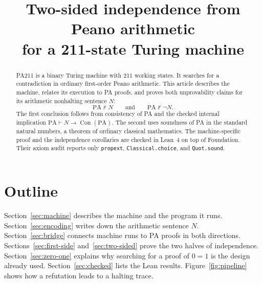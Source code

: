 \documentclass[11pt,letterpaper]{article}
\title{Two-sided independence from Peano arithmetic\\for a 211-state Turing machine}
\author{}
\date{}
\newcommand{\PA}{\mathrm{PA}}
\newcommand{\Con}{\operatorname{Con}}
\begin{document}
\maketitle
\begin{abstract}
PA211 is a binary Turing machine with 211 working states. It searches for
a contradiction in ordinary first-order Peano arithmetic. This article
describes the machine, relates its execution to PA proofs, and proves
both unprovability claims for its arithmetic nonhalting sentence $N$:
\[
\PA\nvdash N \qquad\text{and}\qquad \PA\nvdash\neg N.
\]
The first conclusion follows from consistency of PA and the checked internal
implication $\PA\vdash N\to\Con(\PA)$. The second uses soundness of PA in
the standard natural numbers, a theorem of ordinary classical mathematics.
The machine-specific proof and the independence corollaries are checked
in Lean~4 on top of Foundation. Their axiom audit reports only
\texttt{propext}, \texttt{Classical.choice}, and \texttt{Quot.sound}.
\end{abstract}

\section*{Outline}

Section~\ref{sec:machine} describes the machine and the program it runs.
Section~\ref{sec:encoding} writes down the arithmetic sentence $N$.
Section~\ref{sec:bridge} connects machine runs to PA proofs in both
directions. Sections~\ref{sec:first-side} and~\ref{sec:two-sided} prove
the two halves of independence. Section~\ref{sec:zero-one} explains why
searching for a proof of $0=1$ is the design already used.
Section~\ref{sec:checked} lists the Lean results.
Figure~\ref{fig:pipeline} shows how a refutation leads to a halting trace.
\end{document}

